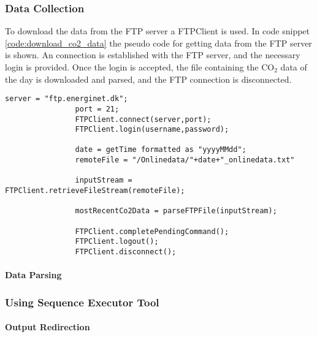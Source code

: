 \documentclass[Main]{subfiles}
\begin{document}
		\subsubsection{Data Collection}
		\label{sub:data_collection}
			To download the data from the FTP server a FTPClient\cite{FTPClient:Online} is used. 
			In code snippet \ref{code:download_co2_data} the pseudo code for getting data from the FTP server is shown. 
			An connection is established with the FTP server, and the necessary login is provided.
			Once the login is accepted, the file containing the CO$_2$ data of the day is downloaded and parsed, and the FTP connection is disconnected.

			\begin{lstlisting}[caption=Download CO2 data, style=Code-C, label=code:download_co2_data]
				server = "ftp.energinet.dk";
        		port = 21;
				FTPClient.connect(server,port);
				FTPClient.login(username,password);

				date = getTime formatted as "yyyyMMdd";
				remoteFile = "/Onlinedata/"+date+"_onlinedata.txt"

				inputStream = FTPClient.retrieveFileStream(remoteFile);

				mostRecentCo2Data = parseFTPFile(inputStream);

				FTPClient.completePendingCommand();
				FTPClient.logout();
				FTPClient.disconnect();
			\end{lstlisting}

			\paragraph{Data Parsing} %
			\label{par:data_parsing}
				

		\subsubsection{Using Sequence Executor Tool} %
		\label{sub:using_sequence_executor_tool}
			

			\paragraph{Output Redirection} %
			\label{par:output_redirection}
				
\end{document}
